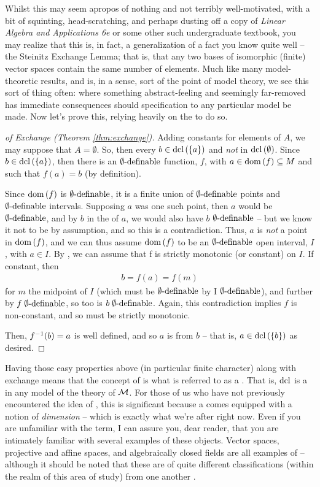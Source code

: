 Whilst this may seem apropos of nothing and not terribly well-motivated, with a bit of squinting, head-scratching, and perhaps dusting off a copy of \emph{Linear Algebra and Applications 6e} or some other such undergraduate textbook, you may realize that this is, in fact, a generalization of a fact you know quite well -- the Steinitz Exchange Lemma; that is, that any two bases of isomorphic (finite) vector spaces contain the same number of elements. Much like many model-theoretic results, and is, in a sense, sort of the point of model theory, we see this sort of thing often: where something abstract-feeling and seemingly far-removed has immediate consequences should specification to any particular model be made. Now let's prove this, relying heavily on the \Mt to do so.

\begin{proof}[of Exchange (Theorem \ref{thm:exchange})]
  Adding constants for elements of $A$, we may suppose that $A = \emptyset$. So, then every $b \in \operatorname{dcl}\left(\{a\}\right)$ and \emph{not} in $\operatorname{dcl}\left(\emptyset\right)$. Since $b \in \operatorname{dcl}\left(\{a\}\right)$, then there is an $\mathrel{\emptyset \textrm{-definable}}$ function, $f$, with $a \in \operatorname{dom}\left(f\right) \subseteq M$ and such that $f(a) = b$ (by definition).

  Since $\operatorname{dom}\left(f\right)$ is $\mathrel{\emptyset \textrm{-definable}}$, it is a finite union of $\mathrel{\emptyset \textrm{-definable}}$ points and $\mathrel{\emptyset \textrm{-definable}}$ intervals. Supposing $a$ was one such point, then $a$ would be $\mathrel{\emptyset \textrm{-definable}}$, and by $b$ in the  of $a$, we would also have $b$ $\mathrel{\emptyset \textrm{-definable}}$ -- but we know it not to be by assumption, and so this is a contradiction. Thus, $a$ is \emph{not} a point in $\operatorname{dom}\left(f\right)$, and we can thus assume $\operatorname{dom}\left(f\right)$ to be an $\mathrel{\emptyset \textrm{-definable}}$ open interval, $I$, with $a \in I$. By \Mt, we can assume that f is strictly monotonic (or constant) on $I$. If constant, then
    \begin{align*}
      b = f(a) = f(m)
    \end{align*}
  for $m$ the midpoint of $I$ (which must be $\mathrel{\emptyset \textrm{-definable}}$ by I $\mathrel{\emptyset \textrm{-definable}}$), and further by $f \mathrel{\emptyset \textrm{-definable}}$, so too is $b \mathrel{\emptyset \textrm{-definable}}$. Again, this contradiction implies $f$ is non-constant, and so must be strictly monotonic.

  Then, $f^{-1}(b) = a$ is well defined, and so $a$ is  from $b$ -- that is, $a \in \operatorname{dcl}\left(\{b\}\right)$ as desired.
  \smartqed
\end{proof}

Having those easy properties above (in particular finite character) along with exchange means that the concept of  is what is referred to as a \emph{\pregeom}. That is, $\operatorname{dcl}$ is a \pregeom in any model of the theory of $\mathcal{M}$. For those of us who have not previously encountered the idea of \pregeoms, this is significant because a \pregeom comes equipped with a notion of \emph{dimension} -- which is exactly what we're after right now. Even if you are unfamiliar with the term, I can assure you, dear reader, that you are intimately familiar with several examples of these objects. Vector spaces, projective and affine spaces, and algebraically closed fields are all examples of \pregeoms -- although it should be noted that these are of quite different classifications (within the realm of this area of study) from one another \cite{pillay_geometric_1996}.

